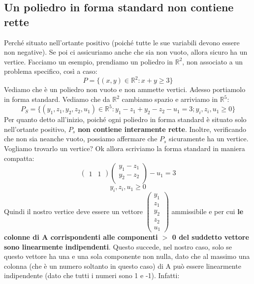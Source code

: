 \subsection{Un poliedro in forma standard non contiene rette} Perché situato nell'ortante positivo (poiché tutte le sue variabili devono essere non negative). Se poi ci assicuriamo anche che sia non vuoto, allora sicuro ha un vertice. Facciamo un esempio, prendiamo un poliedro in $\mathbb{R}^2$, non associato a un problema specifico, così a caso:
\begin{equation*}
    P = \{(x,y) \in \mathbb{R}^2: x + y \geq 3\}
\end{equation*}
Vediamo che è un poliedro non vuoto e non ammette vertici. Adesso portiamolo in forma standard. Vediamo che da $\mathbb{R}^2$ cambiamo spazio e arriviamo in $\mathbb{R}^5$:
\begin{equation*}
    P_S = \{(y_1,z_1,y_2,z_2,u_1) \in \mathbb{R}^5: y_1 - z_1 + y_2 - z_2 - u_1 = 3; y_i,z_i,u_1 \geq 0\}
\end{equation*}
Per quanto detto all'inizio, poiché ogni poliedro in forma standard è situato solo nell'ortante positivo, $P_s$ \textbf{non contiene interamente rette}. Inoltre, verificando che non sia neanche vuoto, possiamo affermare che $P_s$ sicuramente ha un vertice. Vogliamo trovarlo un vertice? Ok allora scriviamo la forma standard in maniera compatta:
\begin{equation*}
    \begin{pmatrix}
        1 & 1
    \end{pmatrix}\begin{pmatrix}
        y_1-z_1\\
        y_2-z_2\\
    \end{pmatrix} - u_1 = 3
\end{equation*}
\begin{equation*}
    y_i,z_i,u_1 \geq 0
\end{equation*}
Quindi il nostro vertice deve essere un vettore $\begin{pmatrix}
        y_1\\
        z_1\\
        y_2\\
        z_2\\
        u_1
    \end{pmatrix}$ ammissibile e per cui \textbf{le colonne di A corrispondenti alle componenti $>$ 0 del suddetto vettore sono linearmente indipendenti}. Questo succede, nel nostro caso, solo se questo vettore ha una e una sola componente non nulla, dato che al massimo una colonna (che è un numero soltanto in questo caso) di A può essere linearmente indipendente (dato che tutti i numeri sono 1 e -1). Infatti:
